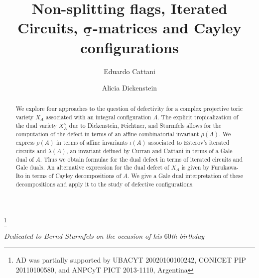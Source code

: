 \documentclass[11pt]{amsart}
\theoremstyle{plain}
\theoremstyle{definition}
\theoremstyle{remark}
\newcommand{\csig}{\ensuremath{\underline{\mathbf \sigma}}}
\numberwithin{equation}{section}
\begin{document}

\title[Flags, Circuits, Matrices and Cayley Configurations]{Non-splitting flags, Iterated Circuits, $\csig$-matrices and
Cayley configurations}

\author[E. Cattani ]{Eduardo Cattani}
\address{Department of Mathematics and Statistics, 
University of Massachusetts Amherst,
Amherst MA 01003-9305,
USA }

\author[A. Dickenstein]{Alicia Dickenstein}
\address{Dto.\ de Matem\'atica, FCEN, Universidad de Buenos Aires, and IMAS (UBA-CONICET), Ciudad Universitaria, Pab.\ I, 
C1428EGA Buenos Aires, Argentina}


\thanks{AD was partially supported by UBACYT 20020100100242, CONICET PIP 20110100580, and ANPCyT PICT 2013-1110, Argentina}  

\date{}

\maketitle



\begin{center}  {\em Dedicated to Bernd Sturmfels
on the occasion  of his $60$th birthday}
\end{center} 
\bigskip


\begin{abstract}
We explore four approaches to the question of defectivity for a complex projective toric variety $X_A$ associated with an integral configuration $A$.  
The explicit tropicalization of the dual variety $X_A^\vee$ due to Dickenstein, Feichtner, and Sturmfels allows for the computation of the defect in terms of 
an affine combinatorial invariant $\rho(A)$.  We express $\rho(A)$ in terms of affine invariants $\iota(A)$ associated to Esterov's iterated circuits and $\lambda(A)$, 
an invariant defined by Curran and Cattani in terms of a Gale dual of $A$. Thus we obtain formulae for the dual defect in terms of iterated circuits and Gale duals. 
An alternative expression for the dual defect of $X_A$ is given by Furukawa-Ito in terms of Cayley decompositions of $A$. 
We give a Gale dual interpretation of these decompositions and apply it to the study of defective configurations.

\end{abstract}
\end{document}
